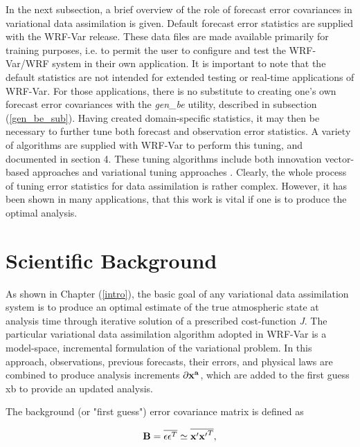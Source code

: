 In the next subsection, a brief overview of the role of forecast error covariances in variational data assimilation is given. Default forecast error statistics are supplied with the WRF-Var release. These data files are made available primarily for training purposes, i.e. to permit the user to configure and test the WRF-Var/WRF system in their own application. It is important to note that the default statistics are not intended for extended testing or real-time applications of WRF-Var. For those applications, there is no substitute to creating one's own forecast error covariances with the {\it gen\_be} utility, described in subsection (\ref{gen_be_sub}). Having created domain-specific statistics, it may then be necessary to further tune both forecast and observation error statistics. A variety of algorithms are supplied with WRF-Var to perform this tuning, and documented in section 4. These tuning algorithms include both innovation vector-based approaches \citep{hollingsworth86}
and variational tuning approaches \citep{desroziers01}. Clearly, the whole process of tuning error statistics for data assimilation is rather complex. However, it has been shown in many applications, that this work is vital if one is to produce the optimal analysis.

\section{Scientific Background}

As shown in Chapter (\ref{intro}), the basic goal of any variational data assimilation system is to produce an optimal estimate of the true atmospheric state at analysis time through iterative solution of a prescribed cost-function {\it J}. The particular variational data assimilation algorithm adopted in WRF-Var is a model-space, incremental formulation of the variational problem.  In this approach, observations, previous forecasts, their errors, and physical laws are combined to produce analysis increments ${\partial \bf x^{a}}$, which are added to the first guess xb to provide an updated analysis.

The background (or "first guess") error covariance matrix is defined as 

\begin{equation}
{\bf B}=\overline{\epsilon \epsilon^{T}} \simeq \overline{{\bf x'}{\bf x'}^{T}},
\label{var-b}
\end{equation}


